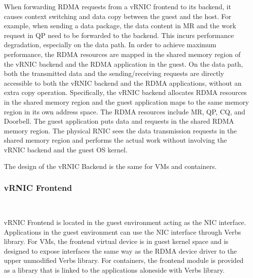 
When forwarding RDMA requests from a vRNIC frontend to its backend, it causes context switching and data copy between the guest and the host. For example, when sending a data package, the data content in MR and the work request in QP need to be forwarded to the backend. This incurs performance degradation, especially on the data path. In order to achieve maximum performance, the RDMA resources are mapped in the shared memory region of the vRNIC backend and the RDMA application in the guest. On the data path, both the transmitted data and the sending/receiving requests are directly accessible to both the vRNIC backend and the RDMA applications, without an extra copy operation. Specifically, the vRNIC backend allocates RDMA resources in the shared memory region and the guest application maps to the same memory region in its own address space. The RDMA resources include MR, QP, CQ, and Doorbell. The guest application puts data and requests in the shared RDMA memory region. The physical RNIC sees the data transmission requests in the shared memory region and performs the actual work without involving the vRNIC backend and the guest OS kernel.

The design of the vRNIC Backend is the same for VMs and containers.

\subsubsection{\textbf{vRNIC Frontend}}

\
\noindent

vRNIC Frontend is located in the guest environment acting as the NIC interface. Applications in the guest environment can use the NIC interface through Verbs library. For VMs, the frontend virtual device is in guest kernel space and is designed to expose interfaces the same way as the RDMA device driver to the upper unmodified Verbs library. For containers, the frontend module is provided as a library that is linked to the applications aloneside with Verbs library.

